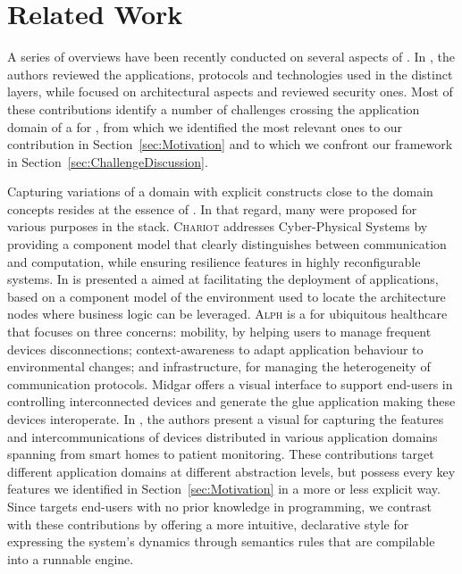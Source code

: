 \section{Related Work}
\label{sec:RW}

A series of overviews have been recently conducted on several aspects of \IOT. In \cite{alfuqaha-15,xu-14a}, the authors reviewed the applications, protocols and technologies used in the distinct \IOT layers, while \cite{singh-14,gubbi-13} focused on architectural aspects and \cite{tan-10,xu-14b} reviewed security ones. Most of these contributions identify a number of challenges crossing the application domain of a \DSL for \IOT, from which we identified the most relevant ones to our contribution in Section~\ref{sec:Motivation} and to which we confront our framework in Section~\ref{sec:ChallengeDiscussion}.

Capturing variations of a domain with explicit constructs close to the domain concepts resides at the essence of \DSLS. In that regard, many \DSLS were proposed for various purposes in the \IOT stack. \textsc{Chariot} \cite{pradhan-15} addresses Cyber-Physical Systems by providing a component model that clearly distinguishes between communication and computation, while ensuring resilience features in highly reconfigurable systems. In \cite{brandtzaeg-12} is presented a \DSL aimed at facilitating the deployment of applications, based on a component model of the environment used to locate the architecture nodes where business logic can be leveraged. \textsc{Alph} \cite{munnelly-08} is a \DSL for ubiquitous healthcare that focuses on three concerns: mobility, by helping users to manage frequent devices disconnections; context-awareness to adapt application behaviour to environmental changes; and infrastructure, for managing the heterogeneity of communication protocols. Midgar \cite{garcia-14} offers a visual interface to support end-users in controlling interconnected devices and generate the glue application making these devices interoperate. In \cite{salihbegovic-15}, the authors present a visual \DSL for capturing the features and intercommunications of devices distributed in various application domains spanning from smart homes to patient monitoring. These contributions target different application domains at different abstraction levels, but possess every key features we identified in Section~\ref{sec:Motivation} in a more or less explicit way. Since \IOTDSL targets end-users with no prior knowledge in programming, we contrast with these contributions by offering a more intuitive, declarative style for expressing the system's dynamics through semantics rules that are compilable into a runnable \CEP engine.

